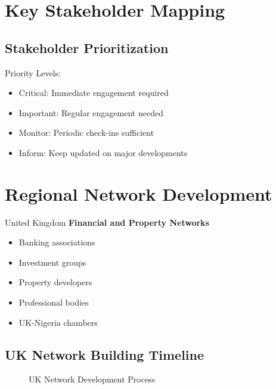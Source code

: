 \section{Key Stakeholder Mapping}

\subsection{Stakeholder Prioritization}
\begin{tcolorbox}[colback=white,colframe=primarydark,title=\textbf{Stakeholder Analysis}]
Priority Levels:
\begin{itemize}
    \item Critical: Immediate engagement required
    \item Important: Regular engagement needed
    \item Monitor: Periodic check-ins sufficient
    \item Inform: Keep updated on major developments
\end{itemize}
\end{tcolorbox}

\FloatBarrier
\section{Regional Network Development}

\begin{regionalbox}{United Kingdom}
\textbf{Financial and Property Networks}
\begin{itemize}
    \item Banking associations
    \item Investment groups
    \item Property developers
    \item Professional bodies
    \item UK-Nigeria chambers
\end{itemize}
\end{regionalbox}

\FloatBarrier
\subsection{UK Network Building Timeline}
\begin{figure}[htbp]
    \centering
    \caption{UK Network Development Process}
    \label{fig:uk-network-timeline}
\end{figure}

